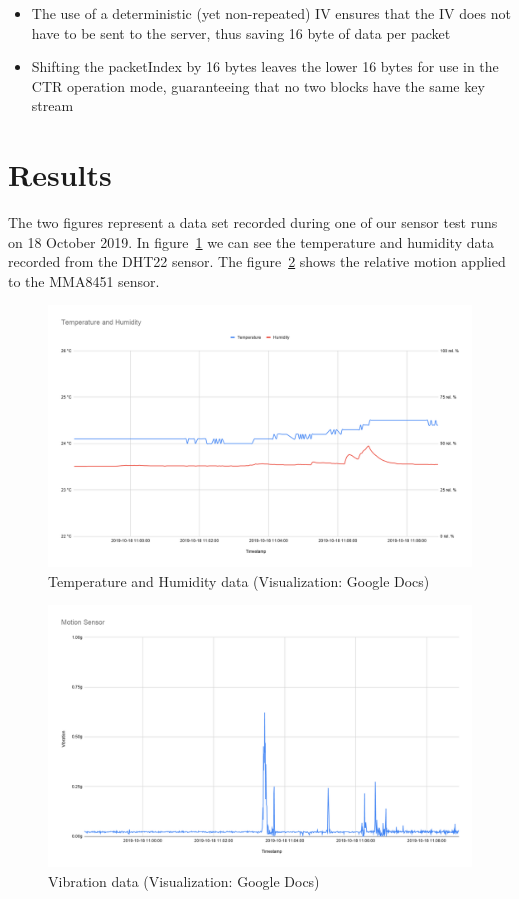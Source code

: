 \documentclass[a4paper,11pt]{scrartcl}
\begin{document}
\begin{itemize}
\item The use of a deterministic (yet non-repeated) IV ensures that the IV does not have to be sent to the server, thus saving 16 byte of data per packet
\item Shifting the packetIndex by 16 bytes leaves the lower 16 bytes for use in the CTR operation mode, guaranteeing that no two blocks have the same key stream
\end{itemize}

\part{Results}
The two figures represent a data set recorded during one of our sensor test runs on 18 October 2019. In figure~\ref{fig:sensor1} we can see the temperature and humidity data recorded from the DHT22 sensor. The figure~\ref{fig:sensor2} shows the relative motion applied to the MMA8451 sensor.

\begin{figure}
    \centering
    \includegraphics[width=14cm]{sensor1}
    \caption{Temperature and Humidity data (Visualization: Google Docs)}
    \label{fig:sensor1}
\end{figure}

\begin{figure}
    \centering
    \includegraphics[width=14cm]{sensor2}
    \caption{Vibration data (Visualization: Google Docs)}
    \label{fig:sensor2}
\end{figure}
\end{document}
